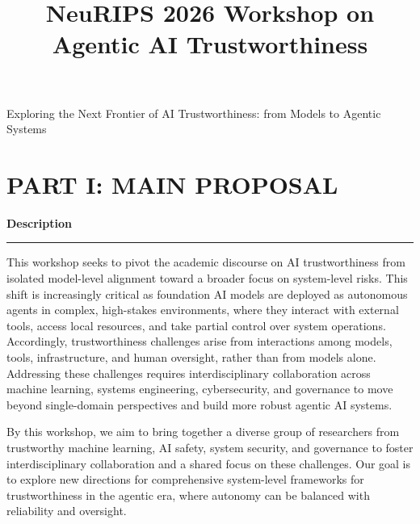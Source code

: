 \documentclass{article}
\title{\large NeuRIPS 2026 Workshop on Agentic AI Trustworthiness\\
\large \textit{\mdseries{Sydney, Australia 6-12 December 2026}}}
\author{}
\date{}
\newcommand{\sectiontitle}[1]{\noindent\textbf{\textcolor{neuripsblue}{#1}}\vspace{0.1cm}\hrule\vspace{0.2cm}}
\begin{document}
\maketitle
\vspace{-7em}
\begin{advertisement}
Exploring the Next Frontier of AI Trustworthiness: from Models to Agentic Systems
\end{advertisement}

\section*{\textcolor{neuripsblue}{\large PART I: MAIN PROPOSAL}}
\sectiontitle{Description}
This workshop seeks to pivot the academic discourse on AI trustworthiness from isolated model-level alignment toward a broader focus on system-level risks. This shift is increasingly critical as foundation AI models are deployed as autonomous agents in complex, high-stakes environments, where they interact with external tools, access local resources, and take partial control over system operations. Accordingly, trustworthiness challenges arise from interactions among models, tools, infrastructure, and human oversight, rather than from models alone. Addressing these challenges requires interdisciplinary collaboration across machine learning, systems engineering, cybersecurity, and governance to move beyond single-domain perspectives and build more robust agentic AI systems.

By this workshop, we aim to bring together a diverse group of researchers from trustworthy machine learning, AI safety, system security, and governance to foster interdisciplinary collaboration and a shared focus on these challenges. Our goal is to explore new directions for comprehensive system-level frameworks for trustworthiness in the agentic era, where autonomy can be balanced with reliability and oversight.
\end{document}
